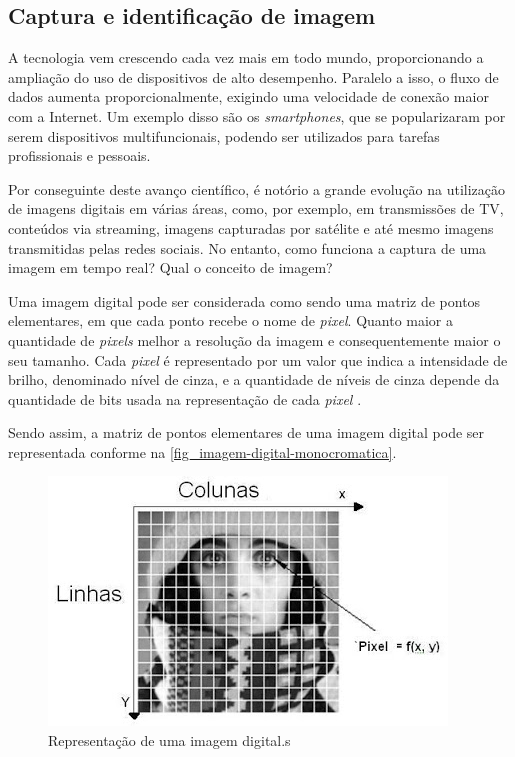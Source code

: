 \subsection{Captura e identificação de imagem}

A tecnologia vem crescendo cada vez mais em todo mundo, proporcionando a ampliação do uso de dispositivos de alto desempenho. Paralelo a isso, o fluxo de dados aumenta proporcionalmente, exigindo uma velocidade de conexão maior com a Internet. Um exemplo disso são os \textit{smartphones}, que se popularizaram por serem dispositivos multifuncionais, podendo ser utilizados para tarefas profissionais e pessoais. 

Por conseguinte deste avanço científico, é notório a grande evolução na utilização de imagens digitais em várias áreas, como, por exemplo, em transmissões de TV, conteúdos via streaming, imagens capturadas por satélite e até mesmo imagens transmitidas pelas redes sociais. No entanto, como funciona a captura de uma imagem em tempo real? Qual o conceito de imagem?

Uma imagem digital pode ser considerada como sendo uma matriz de pontos elementares, em que cada ponto recebe o nome de \textit{pixel}. Quanto maior a quantidade de \textit{pixels} melhor a resolução da imagem e consequentemente maior o seu tamanho. Cada \textit{pixel} é representado por um valor que indica a intensidade de brilho, denominado nível de cinza, e a quantidade de níveis de cinza depende da quantidade de bits usada na representação de cada \textit{pixel} \cite{SOUZA2007}.

Sendo assim, a matriz de pontos elementares de uma imagem digital pode ser representada conforme na \autoref{fig_imagem-digital-monocromatica}.

\begin{figure}[h]
	\caption{\label{fig_imagem-digital-monocromatica}Representação de uma imagem digital.s}
	\begin{center}
		\includegraphics[scale=0.5]{4-Conteudo-Bibliografico/2-Visao-Computacional/Imagens-Visao-Computacional/imagem-digital-monocromatica.JPG}
	\end{center}
	\centering {}
\end{figure}

